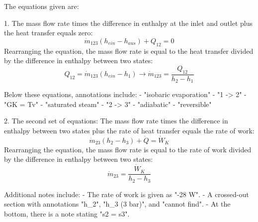 The equations given are:

1. The mass flow rate times the difference in enthalpy at the inlet and outlet plus the heat transfer equals zero:
   \[
   \dot{m}_{123} (h_{ein} - h_{aus}) + Q_{12} = 0
   \]
   Rearranging the equation, the mass flow rate is equal to the heat transfer divided by the difference in enthalpy between two states:
   \[
   Q_{12} = \dot{m}_{123} (h_{ein} - h_{1}) \rightarrow \dot{m}_{123} = \frac{Q_{12}}{h_{2} - h_{1}}
   \]

Below these equations, annotations include:
- "isobaric evaporation"
- "1 -> 2"
- "GK = Tv"
- "saturated steam"
- "2 -> 3"
- "adiabatic"
- "reversible"

2. The second set of equations:
   The mass flow rate times the difference in enthalpy between two states plus the rate of heat transfer equals the rate of work:
   \[
   \dot{m}_{23} (h_{2} - h_{3}) + \dot{Q} = \dot{W}_{K}
   \]
   Rearranging the equation, the mass flow rate is equal to the rate of work divided by the difference in enthalpy between two states:
   \[
   \dot{m}_{23} = \frac{\dot{W}_{K}}{h_{2} - h_{3}}
   \]

Additional notes include:
- The rate of work is given as "-28 W".
- A crossed-out section with annotations "h_{2}", "h_{3} (3 bar)", and "cannot find".
- At the bottom, there is a note stating "s2 = s3".